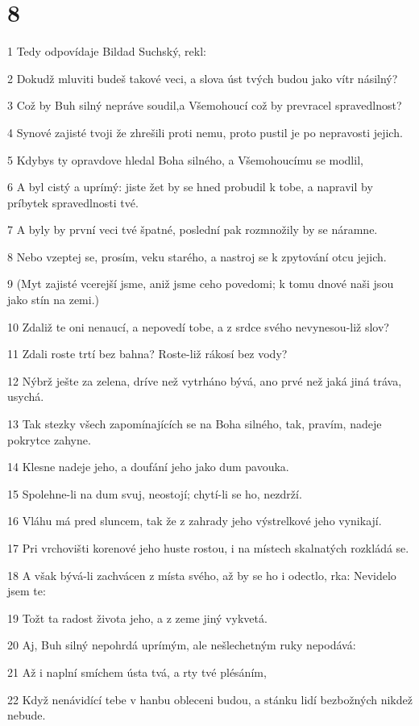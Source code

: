 \chapter{8}

\par 1 Tedy odpovídaje Bildad Suchský, rekl:
\par 2 Dokudž mluviti budeš takové veci, a slova úst tvých budou jako vítr násilný?
\par 3 Což by Buh silný nepráve soudil,a Všemohoucí což by prevracel spravedlnost?
\par 4 Synové zajisté tvoji že zhrešili proti nemu, proto pustil je po nepravosti jejich.
\par 5 Kdybys ty opravdove hledal Boha silného, a Všemohoucímu se modlil,
\par 6 A byl cistý a uprímý: jiste žet by se hned probudil k tobe, a napravil by príbytek spravedlnosti tvé.
\par 7 A byly by první veci tvé špatné, poslední pak rozmnožily by se náramne.
\par 8 Nebo vzeptej se, prosím, veku starého, a nastroj se k zpytování otcu jejich.
\par 9 (Myt zajisté vcerejší jsme, aniž jsme ceho povedomi; k tomu dnové naši jsou jako stín na zemi.)
\par 10 Zdaliž te oni nenaucí, a nepovedí tobe, a z srdce svého nevynesou-liž slov?
\par 11 Zdali roste trtí bez bahna? Roste-liž rákosí bez vody?
\par 12 Nýbrž ješte za zelena, dríve než vytrháno bývá, ano prvé než jaká jiná tráva, usychá.
\par 13 Tak stezky všech zapomínajících se na Boha silného, tak, pravím, nadeje pokrytce zahyne.
\par 14 Klesne nadeje jeho, a doufání jeho jako dum pavouka.
\par 15 Spolehne-li na dum svuj, neostojí; chytí-li se ho, nezdrží.
\par 16 Vláhu má pred sluncem, tak že z zahrady jeho výstrelkové jeho vynikají.
\par 17 Pri vrchovišti korenové jeho huste rostou, i na místech skalnatých rozkládá se.
\par 18 A však bývá-li zachvácen z místa svého, až by se ho i odectlo, rka: Nevidelo jsem te:
\par 19 Tožt ta radost života jeho, a z zeme jiný vykvetá.
\par 20 Aj, Buh silný nepohrdá uprímým, ale nešlechetným ruky nepodává:
\par 21 Až i naplní smíchem ústa tvá, a rty tvé plésáním,
\par 22 Když nenávidící tebe v hanbu obleceni budou, a stánku lidí bezbožných nikdež nebude.


